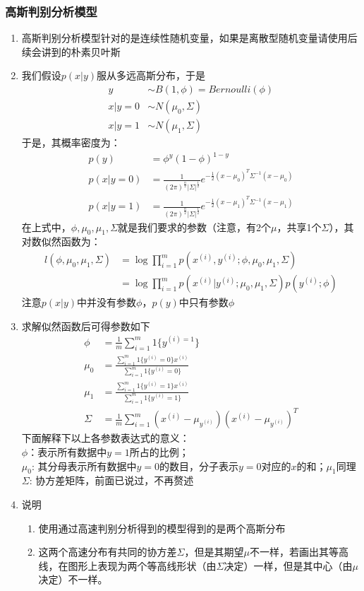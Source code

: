 \subsubsection{高斯判别分析模型}
\begin{enumerate}
	\item 高斯判别分析模型针对的是连续性随机变量，如果是离散型随机变量请使用后续会讲到的朴素贝叶斯
	\item 我们假设$p(x|y)$服从多远高斯分布，于是
	\begin{align}
		y & \sim B(1, \phi) = Bernoulli(\phi) \\
		x|y=0 &\sim N(\mu_0, \Sigma) \\
		x|y=1 &\sim N(\mu_1, \Sigma)
	\end{align}
	于是，其概率密度为：
	\begin{align}
		p(y) &= \phi^y(1-\phi)^{1-y} \\
		p(x|y=0) &= \frac{1}{(2\pi)^{\frac{n}{2}}|\Sigma|^\frac{1}{2}}e^{-\frac{1}{2}(x-\mu_0)^T\Sigma^{-1}(x-\mu_0)} \\
		p(x|y=1) &= \frac{1}{(2\pi)^{\frac{n}{2}}|\Sigma|^\frac{1}{2}}e^{-\frac{1}{2}(x-\mu_1)^T\Sigma^{-1}(x-\mu_1)}
	\end{align}
	在上式中，$\phi, \mu_0, \mu_1, \Sigma$就是我们要求的参数（注意，有2个$\mu$，共享1个$\Sigma$），其对数似然函数为：
	\begin{align}
		l(\phi, \mu_0, \mu_1, \Sigma) &= \log \prod_{i=1}^{m} p\left(x^{(i)}, y^{(i)}; \phi, \mu_0, \mu_1, \Sigma\right) \\
		&= \log \prod_{i=1}^{m} p\left(x^{(i)}|y^{(i)}; \mu_0, \mu_1, \Sigma\right)p\left(y^{(i)};\phi\right)
	\end{align}
	注意$p(x|y)$中并没有参数$\phi$，$p(y)$中只有参数$\phi$
	\item 求解似然函数后可得参数如下
	\begin{align}
		\phi &= \frac{1}{m} \sum_{i=1}^{m}1\{y^{(i)=1}\} \\
		\mu_0 &= \frac{\sum_{i=1}^{m}1\{y^{(i)}=0\}x^{(i)}}{\sum_{i=1}^{m}1\{y^{(i)}=0\}} \\
		\mu_1 &= \frac{\sum_{i=1}^{m}1\{y^{(i)}=1\}x^{(i)}}{\sum_{i=1}^{m}1\{y^{(i)}=1\}} \\
		\Sigma &= \frac{1}{m}\sum_{i=1}^{m}\left(x^{(i)}-\mu_{y^{(i)}}\right)\left(x^{(i)}-\mu_{y^{(i)}}\right)^T
	\end{align}
	下面解释下以上各参数表达式的意义： \\
	$\phi$：表示所有数据中$y=1$所占的比例； \\
	$\mu_0$: 其分母表示所有数据中$y=0$的数目，分子表示$y=0$对应的$x$的和；$\mu_1$同理 \\
	$\Sigma$: 协方差矩阵，前面已说过，不再赘述
	\item 说明
	\begin{enumerate}
		\item 使用通过高速判别分析得到的模型得到的是两个高斯分布
		\item 这两个高速分布有共同的协方差$\Sigma$，但是其期望$\mu$不一样，若画出其等高线，在图形上表现为两个等高线形状（由$\Sigma$决定）一样，但是其中心（由$\mu$决定）不一样。
	\end{enumerate}
\end{enumerate}

